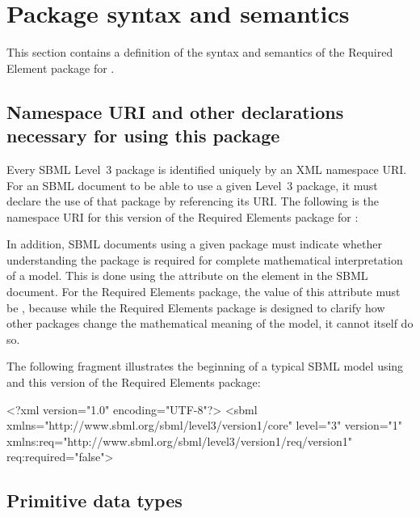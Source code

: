 
\section{Package syntax and semantics}
\label{syntax}

This section contains a definition of the syntax and semantics of the Required Element package for \sbmlthreecore.  

\subsection{Namespace URI and other declarations necessary for using this package}
\label{xml-namespace}

Every SBML Level~3 package is identified uniquely by an XML namespace URI.  For an SBML document to be able to use a given Level~3 package, it must declare the use of that package by referencing its URI.  The following is the namespace URI for this version of the Required Elements package for \sbmlthreecore:
\begin{center}
\end{center}

In addition, SBML documents using a given package must indicate whether understanding the package is required for complete mathematical interpretation of a model.  This is done using the attribute  on the  element in the SBML document.  For the Required Elements package, the value of this attribute must be , because while the Required Elements package is designed to clarify how other packages change the mathematical meaning of the model, it cannot itself do so.

The following fragment illustrates the beginning of a typical SBML model using \sbmlthreecore and this version of the Required Elements package:

\begin{example}
<?xml version="1.0" encoding="UTF-8"?>
<sbml xmlns="http://www.sbml.org/sbml/level3/version1/core" level="3" version="1"
      xmlns:req="http://www.sbml.org/sbml/level3/version1/req/version1" req:required="false">
\end{example}


\subsection{Primitive data types}
\label{new-primitive-types}

